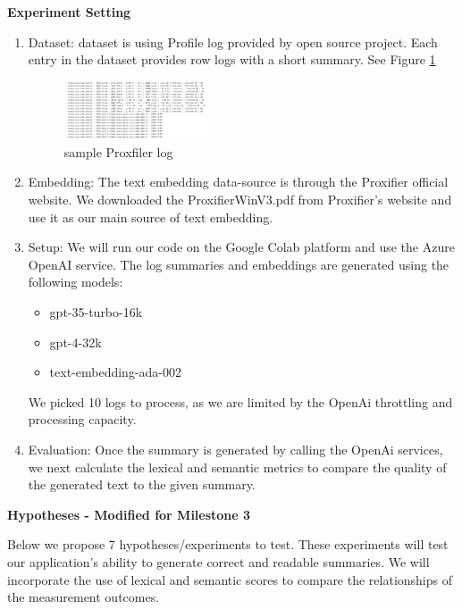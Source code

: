 \documentclass[conference]{IEEEtran}
\begin{document}
\textbf{Experiment Setting}
\begin{enumerate}
    \item Dataset: dataset is using Profile log provided by open source project\cite{liu2019logzip}. Each entry in the dataset provides row logs with a short summary. See Figure \ref{fig:log} 
        \begin{figure}[ht]
        \centering
        \includegraphics[width=0.4\textwidth]{log.png}
        \caption{sample Proxfiler log }
        \label{fig:log}
    \end{figure} 
    \item Embedding: The text embedding data-source is through the Proxifier official website. We downloaded the ProxifierWinV3.pdf from Proxifier's website and use it as our main source of text embedding.
    \item Setup: We will run our code on the Google Colab platform and use the Azure OpenAI service. The log summaries and embeddings are generated using the following models:
    \begin{itemize}
    \item gpt-35-turbo-16k
    \item gpt-4-32k
    \item text-embedding-ada-002
    \end{itemize}
    We picked 10 logs to process, as we are limited by the OpenAi throttling and processing capacity. 
    \item Evaluation: Once the summary is generated by calling the OpenAi services, we next calculate the lexical and semantic metrics to compare the quality of the generated text to the given summary.
\end{enumerate}

\textbf{Hypotheses - Modified for Milestone 3}

Below we propose 7 hypotheses/experiments to test. These experiments will test our application's ability to generate correct and readable summaries. We will incorporate the use of lexical and semantic scores to compare the relationships of the measurement outcomes.
\end{document}
